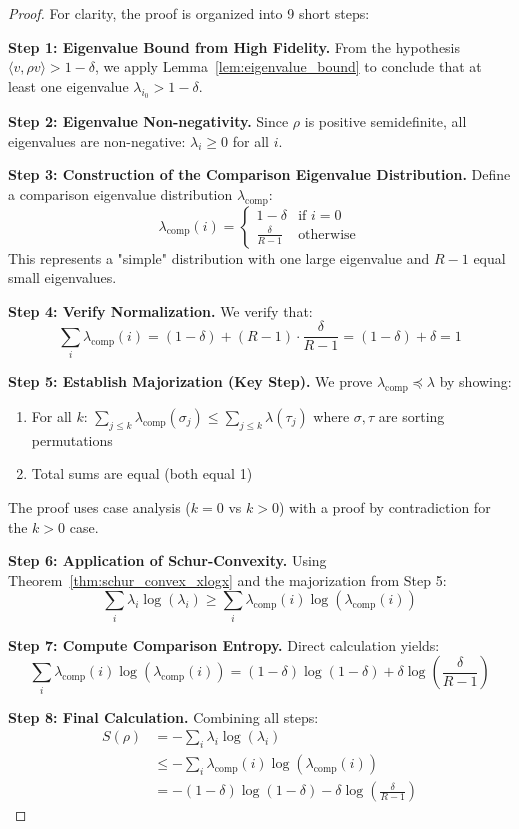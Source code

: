 \begin{proof}
For clarity, the proof is organized into 9 short steps:

\textbf{Step 1: Eigenvalue Bound from High Fidelity.}
From the hypothesis $\langle v, \rho v \rangle > 1 - \delta$, we apply 
Lemma~\ref{lem:eigenvalue_bound} to conclude that at least one eigenvalue $\lambda_{i_0} > 1 - \delta$.

\textbf{Step 2: Eigenvalue Non-negativity.}
Since $\rho$ is positive semidefinite, all eigenvalues are non-negative: $\lambda_i \geq 0$ for all $i$.

\textbf{Step 3: Construction of the Comparison Eigenvalue Distribution.}
Define a comparison eigenvalue distribution $\lambda_{\text{comp}}$:
$$\lambda_{\text{comp}}(i) = \begin{cases}
1 - \delta & \text{if } i = 0 \\
\frac{\delta}{R-1} & \text{otherwise}
\end{cases}$$
This represents a "simple" distribution with one large eigenvalue and $R-1$ equal small eigenvalues.

\textbf{Step 4: Verify Normalization.}
We verify that:
$$\sum_i \lambda_{\text{comp}}(i) = (1-\delta) + (R-1) \cdot \frac{\delta}{R-1} = (1-\delta) + \delta = 1$$

\textbf{Step 5: Establish Majorization (Key Step).}
We prove $\lambda_{\text{comp}} \preceq \lambda$ by showing:
\begin{enumerate}
\item[(a)] For all $k$: $\sum_{j \leq k} \lambda_{\text{comp}}(\sigma_j) \leq \sum_{j \leq k} \lambda(\tau_j)$ 
where $\sigma, \tau$ are sorting permutations
\item[(b)] Total sums are equal (both equal 1)
\end{enumerate}
The proof uses case analysis ($k=0$ vs $k>0$) with a proof by contradiction for the $k>0$ case.

\textbf{Step 6: Application of Schur-Convexity.}
Using Theorem~\ref{thm:schur_convex_xlogx} and the majorization from Step 5:
$$\sum_i \lambda_i \log(\lambda_i) \geq \sum_i \lambda_{\text{comp}}(i) \log(\lambda_{\text{comp}}(i))$$

\textbf{Step 7: Compute Comparison Entropy.}
Direct calculation yields:
$$\sum_i \lambda_{\text{comp}}(i) \log(\lambda_{\text{comp}}(i)) = (1-\delta)\log(1-\delta) + \delta \log\left(\frac{\delta}{R-1}\right)$$

\textbf{Step 8: Final Calculation.}
Combining all steps:
\begin{align*}
S(\rho) &= -\sum_i \lambda_i \log(\lambda_i) \\
&\leq -\sum_i \lambda_{\text{comp}}(i) \log(\lambda_{\text{comp}}(i)) \\
&= -(1-\delta)\log(1-\delta) - \delta \log\left(\frac{\delta}{R-1}\right)
\end{align*}
\end{proof}

